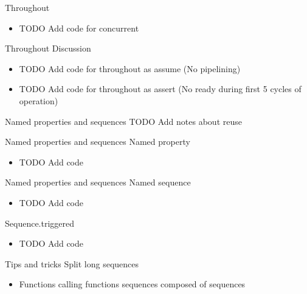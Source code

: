 \documentclass{beamer}
\begin{document}
\begin{frame}{Throughout}
\begin{itemize}
 \item TODO Add code for concurrent
\end{itemize}
\end{frame}


\begin{frame}{Throughout}
Discussion
\begin{itemize}
 \item TODO Add code for throughout as assume (No pipelining)
 \item TODO Add code for throughout as assert (No ready during first 5 cycles of operation)
\end{itemize}
\end{frame}


\begin{frame}{Named properties and sequences}
TODO Add notes about reuse
\end{frame}


\begin{frame}{Named properties and sequences}
Named property
\begin{itemize}
 \item TODO Add code
\end{itemize}
\end{frame}


\begin{frame}{Named properties and sequences}
Named sequence
\begin{itemize}
 \item TODO Add code
\end{itemize}
\end{frame}


\begin{frame}{Sequence.triggered}
\begin{itemize}
 \item TODO Add code
\end{itemize}
\end{frame}


\begin{frame}{Tips and tricks}
Split long sequences

\begin{itemize}
 \item Functions calling functions \textrightarrow{} sequences composed of sequences
\end{itemize}
\end{frame}
\end{document}
